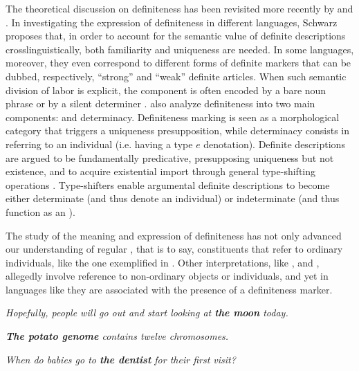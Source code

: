 \documentclass[output=paper]{langsci/langscibook}
\begin{document}
The theoretical discussion on definiteness has been revisited more recently by \citet{Schwarz2009,Schwarz2013} and \citet{CoppockBeaver2015}. In investigating the expression of definiteness in different languages, Schwarz proposes that, in order to account for the semantic value of definite descriptions crosslinguistically, both familiarity and uniqueness are needed. In some languages, moreover, they even correspond to different forms of definite markers that can be dubbed, respectively, “strong” and “weak” definite articles. When such semantic division of labor is explicit, the  component is often encoded by a bare noun phrase or by a silent determiner \citep{ArkohMatthewson2013}. \citet{CoppockBeaver2015} also analyze definiteness into two main components:  and determinacy. Definiteness marking is seen as a morphological category that triggers a uniqueness presupposition, while determinacy consists in referring to an individual (i.e. having a type $e$ denotation). Definite descriptions are argued to be fundamentally predicative, presupposing uniqueness but not existence, and to acquire existential import through general type-shifting operations \citep{Partee1987}. Type-shifters enable argumental definite descriptions to become either determinate (and thus denote an individual) or indeterminate (and thus function as an ). 

The study of the meaning and expression of definiteness has not only advanced our understanding of regular , that is to say, constituents that refer to ordinary individuals, like the one exemplified in . Other interpretations, like  ,   and  , allegedly involve reference to non-ordinary objects or individuals, and yet in languages like  they are associated with the presence of a definiteness marker.

\ea
	\ea \label{ex:aguilar:1a}
	\textit{Hopefully, people will go out and start looking at \textbf{the moon} today.} %
	
	\ex \label{ex:aguilar:1b}
	\textit{\textbf{The potato genome} contains twelve chromosomes.} %
	
	\ex \label{ex:aguilar:1c}
	\textit{When do babies go to \textbf{the dentist} for their first visit?} %
	
\end{document}

